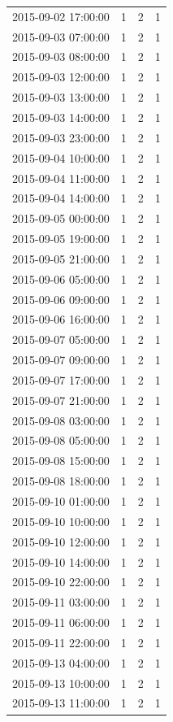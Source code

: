 \begin{tabular}{lrrr}
2015-09-02 17:00:00 & 1 & 2 & 1 \\
2015-09-03 07:00:00 & 1 & 2 & 1 \\
2015-09-03 08:00:00 & 1 & 2 & 1 \\
2015-09-03 12:00:00 & 1 & 2 & 1 \\
2015-09-03 13:00:00 & 1 & 2 & 1 \\
2015-09-03 14:00:00 & 1 & 2 & 1 \\
2015-09-03 23:00:00 & 1 & 2 & 1 \\
2015-09-04 10:00:00 & 1 & 2 & 1 \\
2015-09-04 11:00:00 & 1 & 2 & 1 \\
2015-09-04 14:00:00 & 1 & 2 & 1 \\
2015-09-05 00:00:00 & 1 & 2 & 1 \\
2015-09-05 19:00:00 & 1 & 2 & 1 \\
2015-09-05 21:00:00 & 1 & 2 & 1 \\
2015-09-06 05:00:00 & 1 & 2 & 1 \\
2015-09-06 09:00:00 & 1 & 2 & 1 \\
2015-09-06 16:00:00 & 1 & 2 & 1 \\
2015-09-07 05:00:00 & 1 & 2 & 1 \\
2015-09-07 09:00:00 & 1 & 2 & 1 \\
2015-09-07 17:00:00 & 1 & 2 & 1 \\
2015-09-07 21:00:00 & 1 & 2 & 1 \\
2015-09-08 03:00:00 & 1 & 2 & 1 \\
2015-09-08 05:00:00 & 1 & 2 & 1 \\
2015-09-08 15:00:00 & 1 & 2 & 1 \\
2015-09-08 18:00:00 & 1 & 2 & 1 \\
2015-09-10 01:00:00 & 1 & 2 & 1 \\
2015-09-10 10:00:00 & 1 & 2 & 1 \\
2015-09-10 12:00:00 & 1 & 2 & 1 \\
2015-09-10 14:00:00 & 1 & 2 & 1 \\
2015-09-10 22:00:00 & 1 & 2 & 1 \\
2015-09-11 03:00:00 & 1 & 2 & 1 \\
2015-09-11 06:00:00 & 1 & 2 & 1 \\
2015-09-11 22:00:00 & 1 & 2 & 1 \\
2015-09-13 04:00:00 & 1 & 2 & 1 \\
2015-09-13 10:00:00 & 1 & 2 & 1 \\
2015-09-13 11:00:00 & 1 & 2 & 1 \\

\end{tabular}
